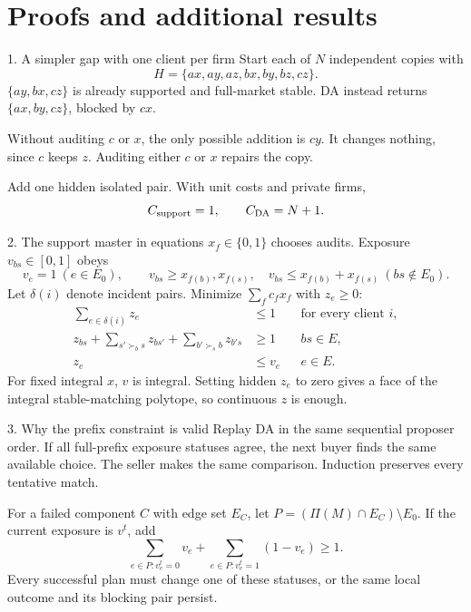 \section{Proofs and additional results}
\begin{frame}[t,label=singleton]{1. A simpler gap with one client per firm}
\small
Start each of $N$ independent copies with
\[
 H=\{ax,ay,az,bx,by,bz,cz\}.
\]
$\{ay,bx,cz\}$ is already supported and full-market stable.
DA instead returns $\{ax,by,cz\}$, blocked by $cx$.

\medskip
Without auditing $c$ or $x$, the only possible addition is $cy$.
It changes nothing, since $c$ keeps $z$. Auditing either $c$ or $x$ repairs the copy.

\medskip
Add one hidden isolated pair. With unit costs and private firms,
\[
 C_{\mathrm{support}}=1,\qquad C_{\mathrm{DA}}=N+1.
\]
\end{frame}

\begin{frame}[t,label=master]{2. The support master in equations}
\fontsize{11}{13}\selectfont
$x_f\in\{0,1\}$ chooses audits. Exposure $v_{bs}\in[0,1]$ obeys
\[
 v_e=1\ (e\in E_0),\qquad
 v_{bs}\geq x_{f(b)},x_{f(s)},\quad
 v_{bs}\leq x_{f(b)}+x_{f(s)}\ (bs\notin E_0).
\]
Let $\delta(i)$ denote incident pairs. Minimize $\sum_fc_fx_f$ with $z_e\geq0$:
\begin{align*}
 \sum_{e\in\delta(i)}z_e&\leq1 &&\text{for every client }i,\\
 z_{bs}+\sum_{s'\succ_b s}z_{bs'}+\sum_{b'\succ_s b}z_{b's}&\geq1 &&bs\in E,\\
 z_e&\leq v_e &&e\in E.
\end{align*}
For fixed integral $x$, $v$ is integral. Setting hidden $z_e$ to zero gives a face
of the integral stable-matching polytope, so continuous $z$ is enough.
\end{frame}

\begin{frame}[t,label=replay]{3. Why the prefix constraint is valid}
\small
Replay DA in the same sequential proposer order. If all full-prefix exposure
statuses agree, the next buyer finds the same available choice. The seller
makes the same comparison. Induction preserves every tentative match.

\medskip
For a failed component $C$ with edge set $E_C$, let
$P=(\Pi(M)\cap E_C)\setminus E_0$. If the current exposure is $v^t$, add
\[
 \sum_{e\in P:v_e^t=0}v_e+
 \sum_{e\in P:v_e^t=1}(1-v_e)\geq1.
\]
Every successful plan must change one of these statuses, or the same local
outcome and its blocking pair persist.
\end{frame}

